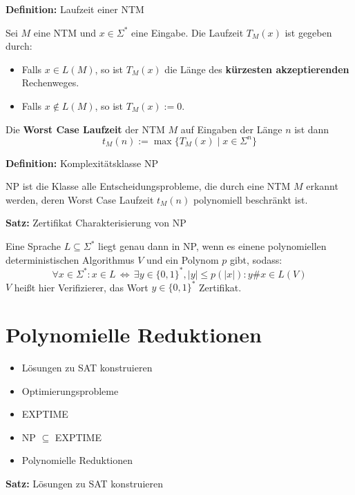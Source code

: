 \documentclass[a4paper,graphics,11pt]{article}
\newcommand{\Iff}[0]{\,\Longleftrightarrow\,}
\begin{document}
\strut

\textbf{Definition:} Laufzeit einer NTM

Sei $M$ eine NTM und $x \in \Sigma^*$ eine Eingabe. Die Laufzeit $T_M(x)$ ist gegeben durch:
\begin{itemize}
    \item Falls $x \in L(M)$, so ist $T_M(x)$ die Länge des \textbf{kürzesten akzeptierenden} Rechenweges.
    \item Falls $x \notin L(M)$, so ist $T_M(x) := 0$.
\end{itemize}
Die \textbf{Worst Case Laufzeit} der NTM $M$ auf Eingaben der Länge $n$ ist dann
$$
    t_M(n) := \max\{T_M(x) \mid x \in \Sigma^n\}
$$

\strut

\textbf{Definition:} Komplexitätsklasse \textsf{NP}

\textsf{NP} ist die Klasse alle Entscheidungsprobleme,
die durch eine NTM $M$ erkannt werden,
deren Worst Case Laufzeit $t_M(n)$ polynomiell beschränkt ist.

\strut

\textbf{Satz:} Zertifikat Charakterisierung von \textsf{NP}

Eine Sprache $L \subseteq \Sigma^*$ liegt genau dann in \textsf{NP}, wenn es
einene polynomiellen deterministischen Algorithmus $V$ und ein Polynom $p$ gibt, sodass:
$$
    \forall x \in \Sigma^*: x \in L \Iff \exists y \in \{0,1\}^*, |y| \leq p(|x|): y\#x \in L(V)
$$
$V$ heißt hier Verifizierer, das Wort $y \in \{0,1\}^*$ Zertifikat.



\newpage



\section{Polynomielle Reduktionen}

\begin{itemize}
    \item Lösungen zu SAT konstruieren
    \item Optimierungsprobleme
    \item \textsf{EXPTIME}
    \item \textsf{NP} $\subseteq$ \textsf{EXPTIME}
    \item Polynomielle Reduktionen
\end{itemize}

\textbf{Satz:} Lösungen zu SAT konstruieren
\end{document}
